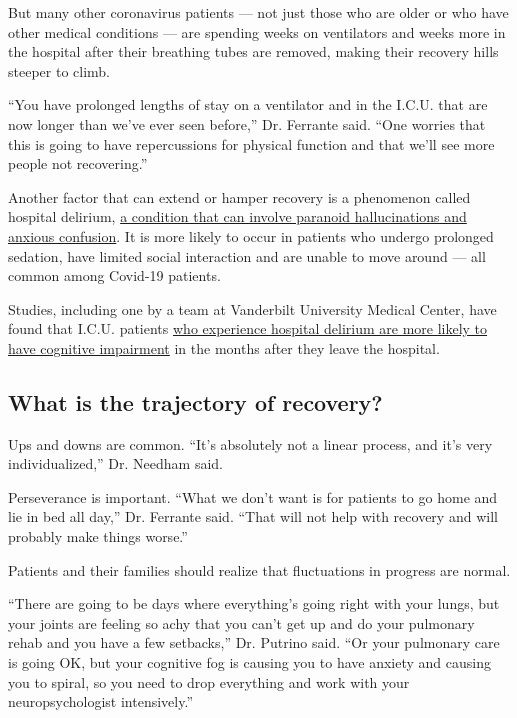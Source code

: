 But many other coronavirus patients --- not just those who are older or
who have other medical conditions --- are spending weeks on ventilators
and weeks more in the hospital after their breathing tubes are removed,
making their recovery hills steeper to climb.

``You have prolonged lengths of stay on a ventilator and in the I.C.U.
that are now longer than we've ever seen before,'' Dr. Ferrante said.
``One worries that this is going to have repercussions for physical
function and that we'll see more people not recovering.''

Another factor that can extend or hamper recovery is a phenomenon called
hospital delirium,
\href{https://www.nytimes3xbfgragh.onion/2020/06/28/health/coronavirus-delirium-hallucinations.html\#commentsContainer}{a
condition that can involve paranoid hallucinations and anxious
confusion}. It is more likely to occur in patients who undergo prolonged
sedation, have limited social interaction and are unable to move around
--- all common among Covid-19 patients.

Studies, including one by a team at Vanderbilt University Medical
Center, have found that I.C.U. patients
\href{https://www.nejm.org/doi/full/10.1056/NEJMoa1301372}{who
experience hospital delirium are more likely to have cognitive
impairment} in the months after they leave the hospital.

\hypertarget{what-is-the-trajectory-of-recovery}{%
\subsection{What is the trajectory of
recovery?}\label{what-is-the-trajectory-of-recovery}}

Ups and downs are common. ``It's absolutely not a linear process, and
it's very individualized,'' Dr. Needham said.

Perseverance is important. ``What we don't want is for patients to go
home and lie in bed all day,'' Dr. Ferrante said. ``That will not help
with recovery and will probably make things worse.''

Patients and their families should realize that fluctuations in progress
are normal.

``There are going to be days where everything's going right with your
lungs, but your joints are feeling so achy that you can't get up and do
your pulmonary rehab and you have a few setbacks,'' Dr. Putrino said.
``Or your pulmonary care is going OK, but your cognitive fog is causing
you to have anxiety and causing you to spiral, so you need to drop
everything and work with your neuropsychologist intensively.''

